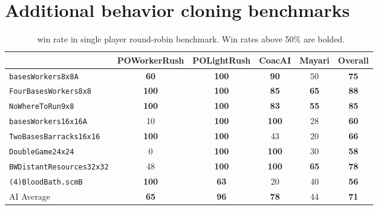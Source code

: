\documentclass[conference,onecolumn]{IEEEtran}
\newcounter{supptable}
\newenvironment{supptable}
  {\renewcommand{\tablename}{Supplemental Table}\setcounter{table}{\value{supptable}}\addtocounter{supptable}{1}\begin{table}}
  {\end{table}\setcounter{supptable}{\value{table}}}
\begin{document}
\section{Additional behavior cloning benchmarks}
\begin{supptable}[H]
    \caption{\bcAgent\ win rate in single player round-robin benchmark. Win rates above 50\% are bolded.}
    \label{tab:bc-winrate}
    \begin{center}
    \begin{tabular}{lcccc|c}
     & POWorkerRush & POLightRush & CoacAI & Mayari & Overall \\
    \midrule
    \texttt{basesWorkers8x8A} & \textbf{60} & \textbf{100} & \textbf{90} & 50 & \textbf{75} \\
    \texttt{FourBasesWorkers8x8} & \textbf{100} & \textbf{100} & \textbf{85} & \textbf{65} & \textbf{88} \\
    \texttt{NoWhereToRun9x8} & \textbf{100} & \textbf{100} & \textbf{83} & \textbf{55} & \textbf{85} \\
    \texttt{basesWorkers16x16A} & 10 & \textbf{100} & \textbf{100} & 28 & \textbf{60} \\
    \texttt{TwoBasesBarracks16x16} & \textbf{100} & \textbf{100} & 43 & 20 & \textbf{66} \\
    \texttt{DoubleGame24x24} & 0 & \textbf{100} & \textbf{100} & 30 & \textbf{58} \\
    \texttt{BWDistantResources32x32} & 48 & \textbf{100} & \textbf{100} & \textbf{65} & \textbf{78} \\
    \texttt{(4)BloodBath.scmB} & \textbf{100} & \textbf{63} & 20 & 40 & \textbf{56} \\
    \hline
    AI Average & \textbf{65} & \textbf{96} & \textbf{78} & 44 & \textbf{71} \\
    \end{tabular}
    \end{center}
\end{supptable}




\end{document}

